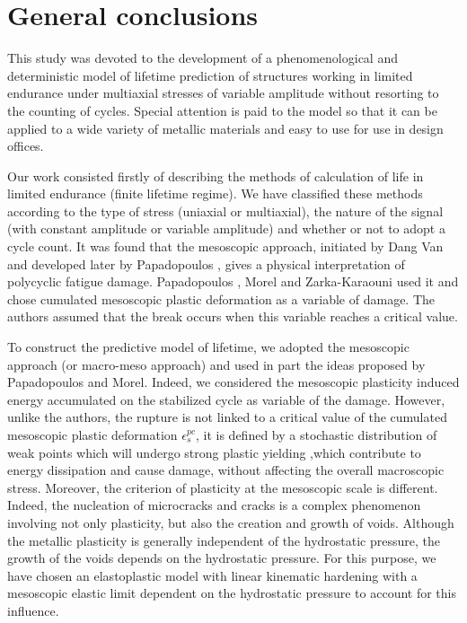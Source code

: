 \chapter{General conclusions}\label{chp:8}
\minitoc
This study was devoted to the development of a phenomenological and deterministic model of lifetime prediction of structures working in limited endurance under multiaxial stresses of variable amplitude without resorting to the counting of cycles. Special attention is paid to the model so that it can be applied to a wide variety of metallic materials and easy to use for use in design offices.

Our work consisted firstly of describing the methods of calculation of life in limited endurance (finite lifetime regime). We have classified these methods according to the type of stress (uniaxial or multiaxial), the nature of the signal (with constant amplitude or variable amplitude) and whether or not to adopt a cycle count. It was found that the mesoscopic approach, initiated by Dang Van \cite{van1986criterion} and developed later by Papadopoulos \cite{papadopoulos2001long}, gives a physical interpretation of polycyclic fatigue damage. Papadopoulos \cite{papadopoulos2001long}, Morel \cite{FFE:FFE452} and Zarka-Karaouni \cite{de2013comportement} used it and chose cumulated mesoscopic plastic deformation as a variable of damage. The authors assumed that the break occurs when this variable reaches a critical value.

To construct the predictive model of lifetime, we adopted the mesoscopic approach (or macro-meso approach) and used in part the ideas proposed by Papadopoulos and Morel. Indeed, we considered the mesoscopic plasticity induced energy accumulated on the stabilized cycle as variable of the damage. However, unlike the authors, the rupture is not linked to a critical value of the cumulated mesoscopic plastic deformation $\epsilon^{pc}_s$, it is defined by a stochastic distribution of weak points which will undergo strong plastic yielding ,which contribute to energy dissipation and cause
damage, without affecting the overall macroscopic stress. Moreover, the criterion of plasticity at the mesoscopic scale is different. Indeed, the nucleation of microcracks and cracks is a complex phenomenon involving not only plasticity, but also the creation and growth of voids. Although the metallic plasticity is generally independent of the hydrostatic pressure, the growth of the voids depends on the hydrostatic pressure. For this purpose, we have chosen an elastoplastic model with linear kinematic hardening with a mesoscopic elastic limit dependent on the hydrostatic pressure to account for this influence.

